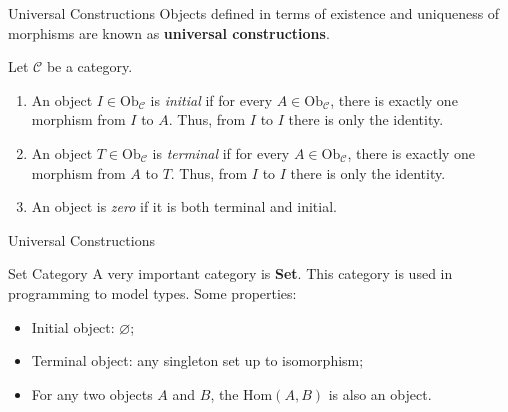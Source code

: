 \documentclass[aspectratio=169,xcolor=dvipsnames,10pt]{beamer}
\begin{document}
\begin{frame}[fragile]{Universal Constructions}
	Objects defined in terms of existence and
	uniqueness of morphisms are known as \textbf{universal constructions}.
	\begin{definition}
		Let $\mathcal C$ be a category.
		\begin{enumerate}[1.]
			\item An object $I \in \text{Ob}_\mathcal C$ is \textit{initial} if for every $A \in \text{Ob}_\mathcal C$,
			      there is exactly one morphism from $I$ to $A$. Thus, from $I$ to $I$ there is only the identity.
			\item An object $T \in \text{Ob}_\mathcal C$ is \textit{terminal} if for every $A \in \text{Ob}_\mathcal C$,
			      there is exactly one morphism from $A$ to $T$. Thus, from $I$ to $I$ there is only the identity.
			\item An object is \textit{zero} if it is both terminal and initial.
		\end{enumerate}
	\end{definition}
\end{frame}
\begin{frame}[fragile]{Universal Constructions}
	\begin{definition}[Product]
	\end{definition}
\end{frame}

\begin{frame}[fragile]{Set Category}
    A very important category is \textbf{Set}. This category is used in programming
    to model types. Some properties:
    \begin{itemize}
        \item Initial object: $\varnothing$;
        \item Terminal object: any singleton set up to isomorphism;
        \item For any two objects $A$ and $B$, the $\text{Hom}(A,B)$ is also an object.
    \end{itemize}

\end{frame}
\end{document}
